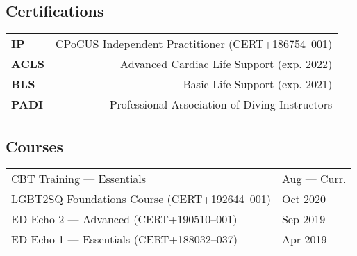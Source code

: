 \documentclass[a4paper,10pt,oneside,onecolumn,draft]{article} %
\begin{document}
\begin{multicols}{2}
  \subsection*{Certifications}
  \begin{supertabular}{a@{\SubVRule}D}
      {\bfseries IP}&{CPoCUS Independent Practitioner }{\scriptsize (CERT+186754--001)}\\
      {\bfseries ACLS}&{Advanced Cardiac Life Support }{\scriptsize (exp. 2022)}\\
      {\bfseries BLS}&{Basic Life Support }{\scriptsize(exp. 2021)}\\
      {\bfseries PADI}&{Professional Association of Diving Instructors}\\
    \end{supertabular}
    \subsection*{Courses}
    \begin{supertabular}{E@{\VRule}z}
      {CBT Training --- Essentials}&Aug --- Curr.\\
      {LGBT2SQ Foundations Course }{\scriptsize (CERT+192644--001)}&{Oct 2020}\\
      {ED Echo 2 --- Advanced }{\scriptsize (CERT+190510--001)}&Sep 2019\\
      {ED Echo 1 --- }{Essentials }{\scriptsize (CERT+188032--037)}&Apr 2019\\
      
  \end{supertabular}
\end{multicols}
\end{document}
